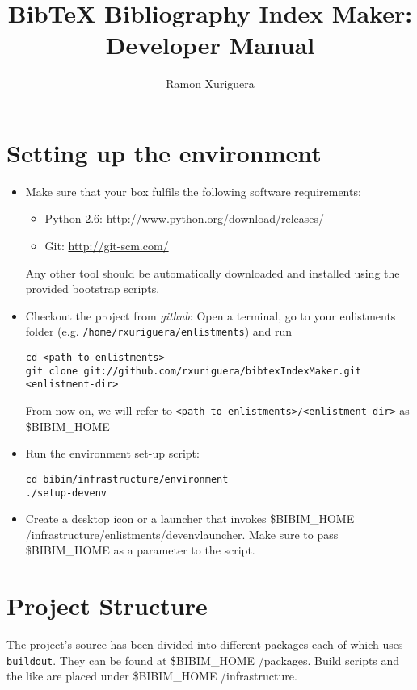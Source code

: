 \documentclass[a4paper,oneside]{article}
\title{BibTeX Bibliography Index Maker: Developer Manual}
\author{Ramon Xuriguera}
\date{}
\newcommand{\bimhome}{\$BIBIM\_HOME }
\begin{document}
\maketitle

\section{Setting up the environment}
\begin{itemize}
    \item{}
    Make sure that your box fulfils the following software requirements:
    \begin{itemize}
        \item{Python 2.6: }
            \url{http://www.python.org/download/releases/}
        \item{Git: }
            \url{http://git-scm.com/}
    \end{itemize}
    Any other tool should be automatically downloaded and installed using the provided bootstrap scripts.

    \item{Checkout the project from \textit{github}:}
    Open a terminal, go to your enlistments folder (e.g. \texttt{/home/rxuriguera/enlistments}) and run
    \begin{lstlisting}
cd <path-to-enlistments>
git clone git://github.com/rxuriguera/bibtexIndexMaker.git <enlistment-dir>
    \end{lstlisting}
    From now on, we will refer to \texttt{<path-to-enlistments>/<enlistment-dir>} as \bimhome

    \item{}
    Run the environment set-up script:
    \begin{lstlisting}
cd bibim/infrastructure/environment
./setup-devenv
    \end{lstlisting}

    \item{}
    Create a desktop icon or a launcher that invokes \bimhome/infrastructure/enlistments/devenvlauncher. Make sure to pass \bimhome as a parameter to the script.
\end{itemize}

\section{Project Structure}
The project's source has been divided into different packages each of which uses \texttt{buildout}. They can be found at \bimhome/packages. Build scripts and the like are placed under \bimhome/infrastructure.
\end{document}

